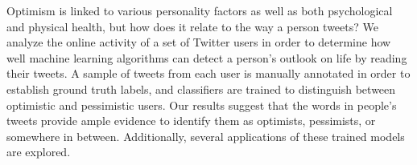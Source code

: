 Optimism is linked to various personality factors as well as both psychological and physical health, but how does it relate to the way a person tweets? We analyze the online activity of a set of Twitter users in order to determine how well machine learning algorithms can detect a person's outlook on life by reading their tweets. A sample of tweets from each user is manually annotated in order to establish ground truth labels, and classifiers are trained to distinguish between optimistic and pessimistic users. Our results suggest that the words in people's tweets provide ample evidence to identify them as optimists, pessimists, or somewhere in between. Additionally, several applications of these trained models are explored.
